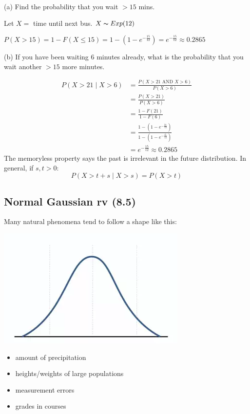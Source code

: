 (a) Find the probability that you wait $ >15 $ mins.

Let $ X= $ time until next bus. $ X \thicksim Exp(12) $

$ P(X>15)=1-F(X\le 15)=1-\left(1-e^{-\frac{15}{12}}\right)= e^{-\frac{15}{12}}
\approx 0.2865$

(b) If you have been waiting 6 minutes already, what is the probability
that you wait another $ >15 $ more minutes.

\begin{align*}
    P(X>21\mid X>6)&=\frac{P(X>21\text{ AND } X>6)}{P(X>6)}\\
    &=\frac{P(X>21)}{P(X>6)}\\
    &=\frac{1-F(21)}{1-F(6)}\\
    &=\frac{1-(1-e^{-\frac{21}{12}})}{1-(1-e^{-\frac{6}{12}})}\\
    &=e^{-\frac{15}{12}}\approx 0.2865
\end{align*}
The memoryless property says the past is irrelevant in the future distribution.
In general, if $ s,t>0 $:
\[ P(X>t+s\mid X>s)=P(X>t) \]

\subsection{Normal Gaussian rv (8.5)}
Many natural phenomena tend to follow a shape like this:

\begin{center}
    \includegraphics{gaussian.png}
\end{center}

\begin{itemize}
    \item amount of precipitation
    \item heights/weights of large populations
    \item measurement errors
    \item grades in courses
\end{itemize}

